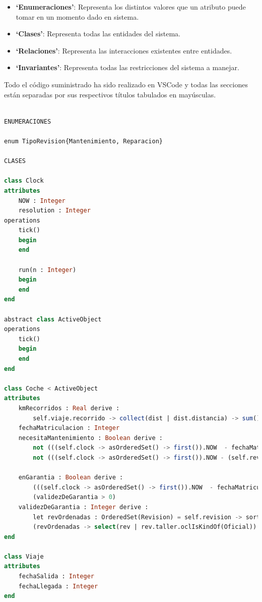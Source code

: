 \documentclass[12pt.a4paper]{article}
\begin{document}
\begin{itemize}
    \item \textbf{‘Enumeraciones’}: Representa los distintos valores que un atributo puede tomar en un momento dado en sistema.
    \item \textbf{‘Clases’}: Representa todas las entidades del sistema.
    \item \textbf{‘Relaciones’}: Representa las interacciones existentes entre entidades.
    \item \textbf{‘Invariantes’}: Representa todas las restricciones del sistema a manejar.
\end{itemize}
Todo el código suministrado ha sido realizado en VSCode y
todas las secciones están separadas por sus respectivos títulos tabulados en mayúsculas.
\vspace{3cm}
\begin{lstlisting}[style = useNormal,language=SQL, caption={Modelo de Sistema de Coches en USE}] 

ENUMERACIONES

enum TipoRevision{Mantenimiento, Reparacion}

CLASES 

class Clock
attributes
    NOW : Integer
    resolution : Integer
operations
    tick()
    begin
    end

    run(n : Integer)
    begin
    end
end

abstract class ActiveObject
operations
    tick()
    begin
    end
end

class Coche < ActiveObject
attributes
    kmRecorridos : Real derive :              
        self.viaje.recorrido -> collect(dist | dist.distancia) -> sum()
    fechaMatriculacion : Integer              
    necesitaMantenimiento : Boolean derive :
        not (((self.clock -> asOrderedSet() -> first()).NOW  - fechaMatriculacion) < 400) or 
        not (((self.clock -> asOrderedSet() -> first()).NOW - (self.revision -> collect(rev | revision.fechaFin) -> max())) < 100) 
        
    enGarantia : Boolean derive :             
        (((self.clock -> asOrderedSet() -> first()).NOW  - fechaMatriculacion) < 400) or
        (validezDeGarantia > 0)
    validezDeGarantia : Integer derive :      
        let revOrdenadas : OrderedSet(Revision) = self.revision -> sortedBy(fechaFin) in
        (revOrdenadas -> select(rev | rev.taller.oclIsKindOf(Oficial)) -> last()).taller.oclAsType(Oficial).garantia
end 

class Viaje
attributes
    fechaSalida : Integer                     
    fechaLlegada : Integer
end


\end{lstlisting}
\end{document}
